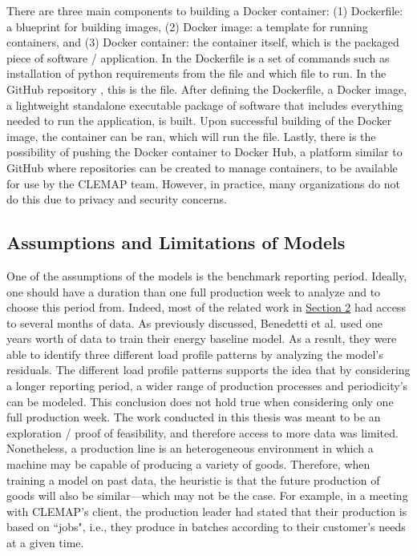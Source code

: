 There are three main components to building a Docker container: (1) Dockerfile: a blueprint for building images, (2) Docker image: a template for running containers, and (3) Docker container: the container itself, which is the packaged piece of software / application. In the Dockerfile is a set of commands such as installation of python requirements from the  file and which file to run. In the GitHub repository \cite{Stechschulte_Gaussian_Processes_for_2022}, this is the  file. After defining the Dockerfile, a Docker image, a lightweight standalone executable package of software that includes everything needed to run the application, is built. Upon successful building of the Docker image, the container can be ran, which will run the  file. Lastly, there is the possibility of pushing the Docker container to Docker Hub, a platform similar to GitHub where repositories can be created to manage containers, to be available for use by the CLEMAP team. However, in practice, many organizations do not do this due to privacy and security concerns.

\subsection{Assumptions and Limitations of Models}

One of the assumptions of the models is the benchmark reporting period. Ideally, one should have a duration than one full production week to analyze and to choose this period from. Indeed, most of the related work in \hyperlink{section.2}{Section 2} had access to several months of data. As previously discussed, Benedetti et al. \cite{cas} used one years worth of data to train their energy baseline model. As a result, they were able to identify three different load profile patterns by analyzing the model's residuals. The different load profile patterns supports the idea that by considering a longer reporting period, a wider range of production processes and periodicity's can be modeled. This conclusion does not hold true when considering only one full production week. The work conducted in this thesis was meant to be an exploration / proof of feasibility, and therefore access to more data was limited. Nonetheless, a production line is an heterogeneous environment in which a machine may be capable of producing a variety of goods. Therefore, when training a model on past data, the heuristic is that the future production of goods will also be similar—which may not be the case. For example, in a meeting with CLEMAP's client, the production leader had stated that their production is based on ``jobs", i.e., they produce in batches according to their customer's needs at a given time.

